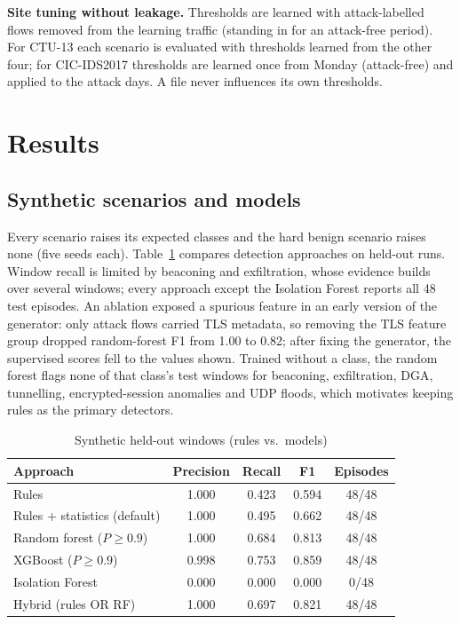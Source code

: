 \documentclass[conference]{IEEEtran}
\begin{document}
\textbf{Site tuning without leakage.} Thresholds are learned with attack-labelled flows removed from the learning traffic (standing in for an attack-free period). For CTU-13 each scenario is evaluated with thresholds learned from the other four; for CIC-IDS2017 thresholds are learned once from Monday (attack-free) and applied to the attack days. A file never influences its own thresholds.

\section{Results}\label{sec:results}
\subsection{Synthetic scenarios and models}
Every scenario raises its expected classes and the hard benign scenario raises none (five seeds each). Table~\ref{tab:synthetic} compares detection approaches on held-out runs. Window recall is limited by beaconing and exfiltration, whose evidence builds over several windows; every approach except the Isolation Forest reports all 48 test episodes. An ablation exposed a spurious feature in an early version of the generator: only attack flows carried TLS metadata, so removing the TLS feature group dropped random-forest F1 from 1.00 to 0.82; after fixing the generator, the supervised scores fell to the values shown. Trained without a class, the random forest flags none of that class's test windows for beaconing, exfiltration, DGA, tunnelling, encrypted-session anomalies and UDP floods, which motivates keeping rules as the primary detectors.

\begin{table}[t]
\caption{Synthetic held-out windows (rules vs.\ models)}\label{tab:synthetic}
\centering\footnotesize
\begin{tabular}{@{}lcccc@{}}
\toprule
Approach & Precision & Recall & F1 & Episodes \\
\midrule
Rules & 1.000 & 0.423 & 0.594 & 48/48 \\
Rules + statistics (default) & 1.000 & 0.495 & 0.662 & 48/48 \\
Random forest ($P\geq0.9$) & 1.000 & 0.684 & 0.813 & 48/48 \\
XGBoost ($P\geq0.9$) & 0.998 & 0.753 & 0.859 & 48/48 \\
Isolation Forest & 0.000 & 0.000 & 0.000 & 0/48 \\
Hybrid (rules OR RF) & 1.000 & 0.697 & 0.821 & 48/48 \\
\bottomrule
\end{tabular}
\end{table}
\end{document}

